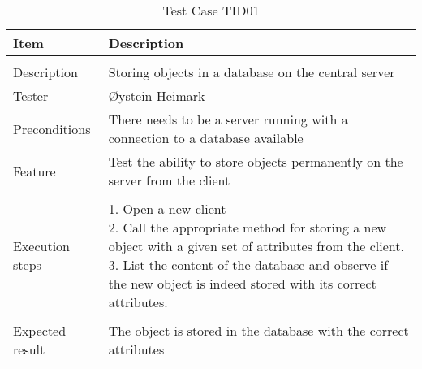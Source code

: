 \begin{table}[H]
\caption{Test Case TID01}
\centering
\begin{tabular}{ l p{13cm} }
\hline
 Item            & Description                                                              \\
\hline \\ [-2.0ex]
 Description     & Storing objects in a database on the central server                        \\
 Tester          & Øystein Heimark                  \\
 Preconditions   & There needs to be a server running with a connection to a database available \\
 Feature         & Test the ability to store objects permanently on the server from the client  \vspace{3pt}                     \\
\hline \\ [-1.5ex]
 Execution steps & \pbox{13cm}{1. Open a new client \\ 2. Call the appropriate method for storing a new object with a given set of attributes from the client. \\ 3. List the content of the database and observe if the new object is indeed stored with its correct attributes. } \vspace{3pt} \\
\hline \\ [-1.5ex]
 Expected result & The object is stored in the database with the correct attributes                                          \\
\hline
\end{tabular}
\label{table:testcasetid01}
\end{table}


